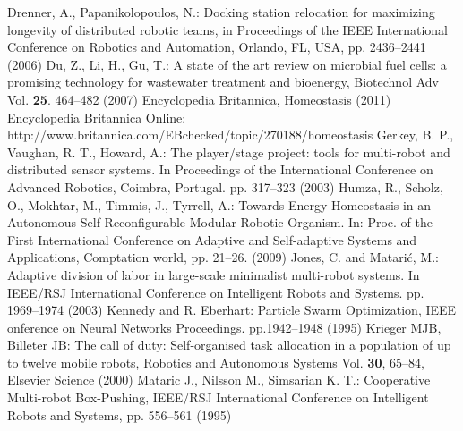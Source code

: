 \documentclass[journal]{IEEEtran}
\begin{document}
%
%
%
\begin{thebibliography}{1}
Drenner, A., Papanikolopoulos, N.: Docking station relocation for maximizing longevity of distributed robotic teams, in Proceedings of the IEEE International Conference on Robotics and Automation, Orlando, FL, USA, pp. 2436--2441 (2006)
Du, Z., Li, H., Gu, T.: A state of the art review on microbial fuel cells: a promising technology for wastewater treatment and bioenergy, Biotechnol Adv Vol. \textbf{25}. 464–482 (2007)
Encyclopedia Britannica, Homeostasis (2011) Encyclopedia Britannica Online: http://www.britannica.com/EBchecked/topic/270188/homeostasis
Gerkey, B. P., Vaughan, R. T., Howard, A.: The player/stage project: tools for multi-robot and distributed sensor systems. In Proceedings of the International Conference on Advanced Robotics, Coimbra, Portugal. pp. 317--323 (2003)
Humza, R., Scholz, O., Mokhtar, M., Timmis, J., Tyrrell, A.: Towards Energy Homeostasis in an Autonomous Self-Reconfigurable Modular Robotic Organism. In: Proc. of the First International Conference on Adaptive and Self-adaptive Systems and Applications, Comptation world, pp. 21--26. (2009)
Jones, C. and Matari\'c, M.: Adaptive division of labor in large-scale minimalist multi-robot systems. In IEEE/RSJ International Conference on Intelligent Robots and Systems. pp. 1969--1974 (2003)
Kennedy and R. Eberhart: Particle Swarm Optimization, IEEE onference on Neural Networks Proceedings. pp.1942--1948 (1995)
Krieger MJB, Billeter JB: The call of duty: Self-organised task allocation in a population of up to twelve mobile robots, Robotics and Autonomous Systems Vol. \textbf{30}, 65--84, Elsevier Science (2000)
Mataric J., Nilsson M., Simsarian K. T.: Cooperative Multi-robot Box-Pushing, IEEE/RSJ International Conference on Intelligent Robots and Systems, pp. 556--561 (1995)

\end{thebibliography}
\end{document}
